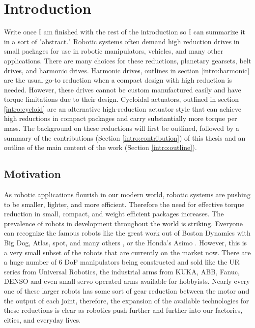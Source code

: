 
\chapter{Introduction}\label{ch:intro}
Write once I am finished with the rest of the introduction so I can summarize it in a sort of "abstract." 
Robotic systems often demand high reduction drives in small packages for use in robotic manipulators, vehicles, and many other applications. There are many choices for these reductions, planetary gearsets, belt drives, and harmonic drives. Harmonic drives, outlines in section \ref{intro:harmonic} are the usual go-to reduction when a compact design with high reduction is needed. However, these drives cannot be custom manufactured easily and have torque limitations due to their design. Cycloidal actuators, outlined in section \ref{intro:cycloid} are an alternative high-reduction actuator style that can achieve high reductions in compact packages and carry substantially more torque per mass. The background on these reductions will first be outlined, followed by a summary of the contributions (Section \ref{intro:contribution}) of this thesis and an outline of the main content of the work (Section \ref{intro:outline}). 

\section{Motivation} \label{intro:motivation}

As robotic applications flourish in our modern world, robotic systems are pushing to be smaller, lighter, and more efficient. 
Therefore the need for effective torque reduction in small, compact, and weight efficient packages increases. 
The prevalence of robots in development throughout the world is striking. 
Everyone can recognize the famous robots like the great work out of Boston Dynamics with Big Dog, Atlas, spot, and many others \cite{ref:boston_dynamics}, or the Honda's Asimo \cite{ref:asimo}.   
However, this is a very small subset of the robots that are currently on the market now. 
There are a huge number of 6 DoF manipulators being constructed and sold like the UR series from Universal Robotics, the industrial arms from KUKA, ABB, Fanuc, DENSO and even small servo operated arms available for hobbyists. 
Nearly every one of these larger robots has some sort of gear reduction between the motor and the output of each joint, therefore, the expansion of the available technologies for these reductions is clear as robotics push further and further into our factories, cities, and everyday lives. 

